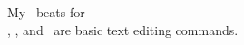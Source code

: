 \documentclass{article}
\begin{document}
	My \faHeartbeat \ beats for \faHandOUp \\
	
	\faCut, \faCopy, and \faPaste \ are basic text editing commands.
\end{document}
